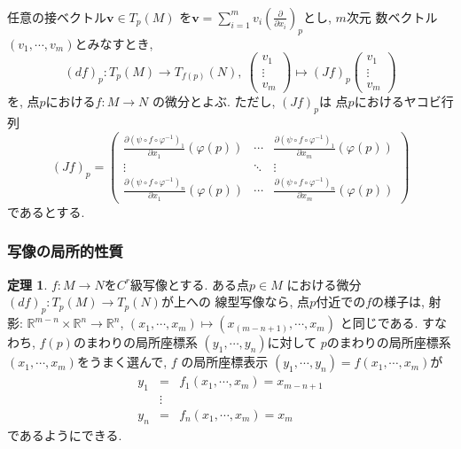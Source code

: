 \documentclass[dvipdfmx,cjk]{beamer}
\theoremstyle{definition}
\newtheorem{thm}[dfn]{\textbf{ 定理 }}
\begin{document}
\begin{frame}
  \frametitle{}
  \begin{definition}\label{def:differential}
    任意の接ベクトル$\boldsymbol{v}\in T_p(M)$
    を$\boldsymbol{v}=
    \sum_{i=1}^{m}v_i\left(\frac{\partial}
    {\partial x_i}\right)_p$とし, $m$次元
    数ベクトル$(v_1,\cdots ,v_m)$とみなすとき, 
     $$(df)_p:T_p(M)\to T_{f(p)}(N),\ 
    \begin{pmatrix}
      v_1\\
      \vdots \\
      v_m
    \end{pmatrix}
    \mapsto
    (Jf)_p
    \begin{pmatrix}
      v_1\\
      \vdots \\
      v_m
    \end{pmatrix}$$
    を, 点$p$における$f:M\to N$
    の微分とよぶ. ただし, $(Jf)_p$は
    点$p$におけるヤコビ行列
    $$(Jf)_p=
    \left(
    \begin{array}{ccc}
      \frac{\partial (\psi\circ f\circ \varphi^{-1})_1}{\partial x_1}(\varphi(p))&\cdots &\frac{\partial (\psi\circ f\circ \varphi^{-1})_1}{\partial x_m}(\varphi(p))\\
      \vdots &\ddots& \vdots \\
      \frac{\partial (\psi\circ f\circ \varphi^{-1})_n}{\partial x_1}(\varphi(p))&\cdots &\frac{\partial (\psi\circ f\circ \varphi^{-1})_n}{\partial x_m}(\varphi(p)) 
    \end{array} 
    \right)$$
    であるとする. 
  \end{definition}
\end{frame}
\begin{frame}
  \frametitle{写像の局所的性質}
  \begin{thm}\label{theo: projection theorem}
    $f:M\to N$を$C^r$級写像とする. ある点$p\in M$
    における微分$(df)_p:T_p(M)\to T_p(N)$が上への
    線型写像なら, 点$p$付近での$f$の様子は, 射影:
    $\mathbb{R}^{m-n} \times \mathbb{R}^n \to \mathbb{R}^n$, 
    $(x_1, \cdots ,x_m)\mapsto (x_(m-n+1), \cdots ,x_m)$
    と同じである. すなわち, $f(p)$のまわりの局所座標系
    $(y_1, \cdots ,y_n)$に対して
    $p$のまわりの局所座標系
    $(x_1,\cdots ,x_m)$をうまく選んで, $f$
    の局所座標表示
    $(y_1, \cdots ,y_n)=f(x_1,\cdots,x_m)$が
    \begin{eqnarray*}
        y_1&=&f_1(x_1,\cdots ,x_m)=x_{m-n+1}\\
        &\vdots& \\
        y_n&=&f_n(x_1,\cdots ,x_m)=x_m
    \end{eqnarray*}
    であるようにできる. 
\end{thm}
\end{frame}
\end{document}
